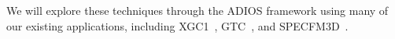 We will explore these techniques through the ADIOS
framework using many of our existing applications, including
XGC1~\cite{chang2006integrated}, GTC~\cite{klasky2003grid}, and SPECFM3D~\cite{SPECFEM3D}.


